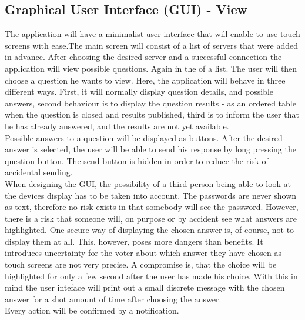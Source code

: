 \documentclass[11pt,twoside,a4paper]{book}
\begin{document}
\subsection{Graphical User Interface (GUI) - View}
The application will have a minimalist user interface that will enable to use touch screens with ease.The main screen will consist of a list of servers that were added in advance. After choosing the desired server and a successful connection the application will view possible questions. Again in the of a list. The user will then choose a question he wants to view. Here, the application will behave in three different ways. First, it will normally display question details, and possible answers, second behaviour is to display the question results - as an ordered table when the question is closed and results published, third is to inform the user that he has already answered, and the results are not yet available.  \\
Possible answers to a question will be displayed as  buttons. After the desired answer is selected, the user will be able to send his response by long pressing the question button. The send button is hidden in order to reduce the risk of accidental sending. \\
When designing the GUI, the possibility of a third person being able to look at the devices display has to be taken into account. The passwords are never shown as text, therefore no risk exists in that somebody will see the password. However, there is a risk that someone will, on purpose or by accident see what answers are highlighted. One secure way of displaying the chosen answer is, of course, not to display them at all. This, however, poses more dangers than benefits. It introduces uncertainty for the voter about which answer they have chosen as touch screens are not very precise. A compromise is, that the choice will be highlighted for only a few second after the user has made his choice. With this in mind the user inteface will print out a small discrete message with the chosen answer for a shot amount of time after choosing the answer. \\
Every action will be confirmed by a notification.\cite{bakalarkaJV}	
\end{document}
